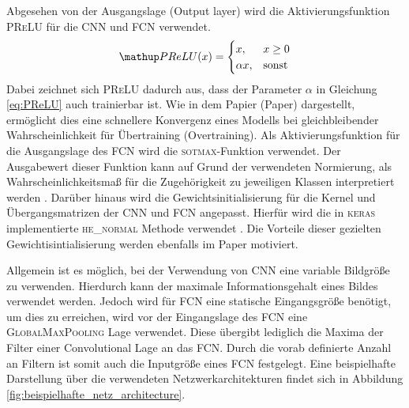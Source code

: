 Abgesehen von der Ausgangslage (Output layer) wird die Aktivierungsfunktion
\textsc{PReLU} für die CNN und FCN verwendet.
\begin{equation}
  \label{eq:PReLU}
  \map{PReLU}(x)= \begin{cases} x,      & x \ge 0\\
                                \alpha x, & \mathrm{sonst}
                  \end{cases}
\end{equation}
Dabei zeichnet sich \textsc{PReLU} dadurch aus, dass der Parameter $\alpha$ in
Gleichung \eqref{eq:PReLU} auch trainierbar ist. Wie in dem Papier (Paper) \cite{he_normal_PReLU}
dargestellt, ermöglicht dies eine schnellere Konvergenz eines Modells
bei gleichbleibender Wahrscheinlichkeit für Übertraining (Overtraining).
Als Aktivierungsfunktion für die Ausgangslage
des FCN wird die \textsc{sotmax}-Funktion verwendet. Der Ausgabewert dieser
Funktion kann auf Grund der verwendeten Normierung, als Wahrscheinlichkeitsmaß
für die Zugehörigkeit zu jeweiligen Klassen interpretiert werden \cite[S. 139]{hands_on_machine_learning}.
Darüber hinaus wird die Gewichtsinitialisierung für die Kernel und
Übergangsmatrizen der CNN und FCN angepasst. Hierfür wird die
in \textsc{keras} implementierte \textsc{he\_normal} Methode
verwendet \cite{keras_he_normal}. Die Vorteile dieser gezielten
Gewichtisintialisierung werden ebenfalls im Paper \cite{he_normal_PReLU} motiviert.

Allgemein ist es möglich, bei der Verwendung von CNN eine variable Bildgröße
zu verwenden. Hierdurch kann der maximale Informationsgehalt eines Bildes
verwendet werden. Jedoch wird für FCN eine statische Eingangsgröße benötigt,
um dies zu erreichen, wird vor der Eingangslage des FCN eine \textsc{GlobalMaxPooling}
Lage verwendet. Diese übergibt lediglich die Maxima der Filter einer Convolutional Lage
an das FCN.
Durch die vorab definierte Anzahl an Filtern ist somit auch die Inputgröße eines
FCN festgelegt.
Eine beispielhafte Darstellung über die verwendeten Netzwerkarchitekturen findet sich
in Abbildung \ref{fig:beispielhafte_netz_architecture}.

